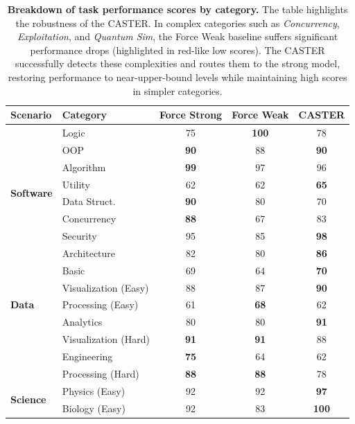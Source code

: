 \documentclass{article}
\theoremstyle{plain}
\theoremstyle{definition}
\theoremstyle{remark}
\begin{document}
\begin{table}[t]
    \centering
    \caption{\textbf{Breakdown of task performance scores by category. }The table highlights the robustness of the CASTER. In complex categories such as \textit{Concurrency}, \textit{Exploitation}, and \textit{Quantum Sim}, the Force Weak baseline suffers significant performance drops (highlighted in red-like low scores). The CASTER successfully detects these complexities and routes them to the strong model, restoring performance to near-upper-bound levels while maintaining high scores in simpler categories.}
    \label{tab:category_breakdown}
    \begin{tabular}{llccc}
        \toprule
        \textbf{Scenario} & \textbf{Category} &  \textbf{Force Strong} &\textbf{Force Weak} & \textbf{CASTER} \\
        \midrule
        \multirow{8}{*}{\textbf{Software}} 
        & Logic &  75 &\textbf{100} & 78 \\
        & OOP &  \textbf{90} &88 & \textbf{90} \\
        & Algorithm &  \textbf{99} &97 & 96 \\
        & Utility &  62 &62 & \textbf{65} \\
        & Data Struct. &  \textbf{90} &80 & 70 \\
        & Concurrency&  \textbf{88}&67 & 83\\ 
        & Security&  95 &85 & \textbf{98} \\ 
        & Architecture&  82 &80 & \textbf{86} \\ 
        \midrule
        \multirow{5}{*}{\textbf{Data}} 
        & Basic &  69&64& \textbf{70}\\
        & Visualization (Easy)&  88&87& \textbf{90}\\
        & Processing (Easy)&  61&\textbf{68}& 62\\ 
        & Analytics &  80&80& \textbf{91}\\
 & Visualization (Hard)&  \textbf{91}&\textbf{91}&88\\
 & Engineering &  \textbf{75}&64&62\\
        & Processing (Hard)&  \textbf{88}&\textbf{88}& 78\\
        \midrule
        \multirow{5}{*}{\textbf{Science}} 
        & Physics (Easy)&  92&92& \textbf{97}\\
        & Biology (Easy)&  92&83& \textbf{100}\\ %

\end{tabular}
\end{table}
\end{document}
